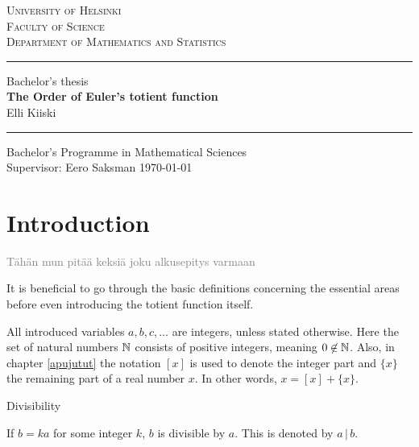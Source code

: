\documentclass{article}
\begin{document}
\begin{titlepage}
\setlength{\parindent}{0mm}
\Large
\textsc{University of Helsinki \\
Faculty of Science\\
Department of Mathematics and Statistics}
\vspace{5mm}
\hrule height2pt

\begin{center}
\vfill
\Large Bachelor's thesis  \\
\vspace{3mm}
\huge 
\textbf{The Order of Euler's totient function}\\
\vspace{3mm}
\Large Elli Kiiski
\vfill
\end{center}

\hrule height2pt
\vspace{5mm}
Bachelor's Programme in Mathematical Sciences \\[2mm]
Supervisor: Eero Saksman
\hfill
\today
\end{titlepage}

\tableofcontents
\thispagestyle{empty}
\clearpage

\section{Introduction}

\textcolor{gray}{Tähän mun pitää keksiä joku alkusepitys varmaan}

It is beneficial to go through the basic definitions concerning the essential areas before even introducing the totient function itself.

All introduced variables $a, b, c, \dots$ are integers, unless stated otherwise. Here the set of natural numbers $\mathbb{N}$ consists of positive integers, meaning $0 \not\in \mathbb{N}$. Also, in chapter \ref{apujutut} the notation $[x]$ is used to denote the integer part and $\{x\}$ the remaining part of a real number $x$. In other words, $x=[x]+\{x\}$.

\begin{definition}
Divisibility

If $b=ka$ for some integer $k$, $b$ is divisible by $a$. This is denoted by $a \,\vert\, b$.

\end{definition}
\end{document}
